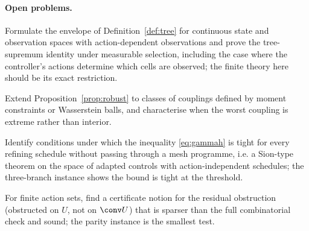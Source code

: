 \paragraph{Open problems.}
\begin{openproblem}\label{op:continuous}
Formulate the envelope of Definition~\ref{def:tree} for continuous state and observation spaces with action-dependent observations and prove the tree-supremum identity under measurable selection, including the case where the controller's actions determine which cells are observed; the finite theory here should be its exact restriction.
\end{openproblem}
\begin{openproblem}\label{op:robust}
Extend Proposition~\ref{prop:robust} to classes of couplings defined by moment constraints or Wasserstein balls, and characterise when the worst coupling is extreme rather than interior.
\end{openproblem}
\begin{openproblem}\label{op:integrated}
Identify conditions under which the inequality \eqref{eq:gammah} is tight for every refining schedule without passing through a mesh programme, i.e. a Sion-type theorem on the space of adapted controls with action-independent schedules; the three-branch instance shows the bound is tight at the threshold.
\end{openproblem}
\begin{openproblem}\label{op:nonconvex}
For finite action sets, find a certificate notion for the residual obstruction (obstructed on $U$, not on $\conv U$) that is sparser than the full combinatorial check and sound; the parity instance is the smallest test.
\end{openproblem}
